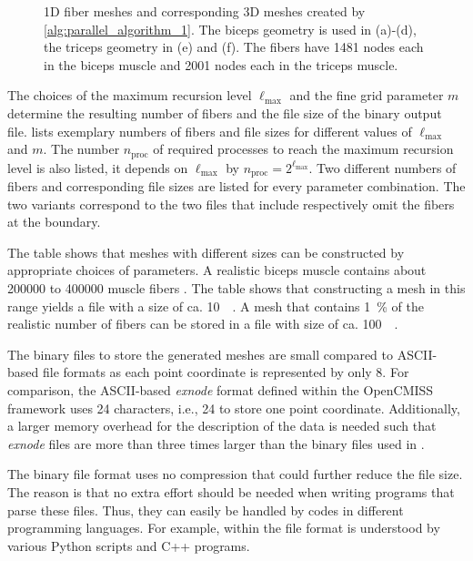 \begin{figure}
  \caption{1D fiber meshes and corresponding 3D meshes created by \cref{alg:parallel_algorithm_1}. The biceps geometry is used in (a)-(d), the triceps geometry in (e) and (f). The fibers have 1481 nodes each in the biceps muscle and 2001 nodes each in the triceps muscle.}%
  \label{fig:muscle_meshes}%
\end{figure}%

The choices of the maximum recursion level $\ell_\text{max}$ and the fine grid parameter $m$ determine the resulting number of fibers and the file size of the binary output file.  lists exemplary numbers of fibers and file sizes for different values of $\ell_\text{max}$ and $m$. The number $n_\text{proc}$ of required processes to reach the maximum recursion level is also listed, it depends on $\ell_\text{max}$ by $n_\text{proc}=2^{\ell_\text{max}}$. Two different numbers of fibers and corresponding file sizes are listed for every parameter combination. The two variants correspond to the two files that include respectively omit the fibers at the boundary.

The table shows that meshes with different sizes can be constructed by appropriate choices of parameters. A realistic biceps muscle contains about \num{200000} to \num{400000} muscle fibers \cite{MacDougall1984}. The table shows that constructing a mesh in this range yields a file with a size of ca. \SI{10}{\gibi\byte}. A mesh that contains \SI{1}{\percent} of the realistic number of fibers can be stored in a file with size of ca. \SI{100}{\mebi\byte}. 

The binary files to store the generated meshes are small compared to ASCII-based file formats as each point coordinate is represented by only \SI{8}{\byte}. For comparison, the ASCII-based \emph{exnode} format defined within the OpenCMISS framework uses 24 characters, i.e., \SI{24}{\byte} to store one point coordinate. Additionally, a larger memory overhead for the description of the data is needed such that \emph{exnode} files are more than three times larger than the binary files used in \opendihu{}.

The binary file format uses no compression that could further reduce the file size. The reason is that no extra effort should be needed when writing programs that parse these files. Thus, they can easily be handled by codes in different programming languages. For example, within \opendihu{} the file format is understood by various Python scripts and C++ programs.

